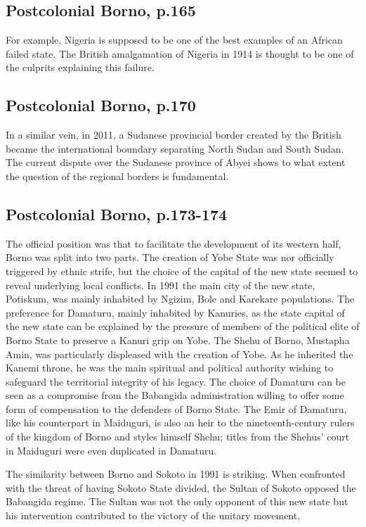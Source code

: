 \documentclass[12pt]{article}
\begin{document}
\subsection{Postcolonial Borno, p.165}

For example, Nigeria is supposed to be one of the best examples of an African
failed state. The British amalgamation of Nigeria in 1914 is thought to be one
of the culprits explaining this failure.

\subsection{Postcolonial Borno, p.170}

In a similar vein, in 2011, a Sudanese provincial border created by the British
became the international boundary separating North Sudan and South Sudan. The
current dispute over the Sudanese province of Abyei shows to what extent the
question of the regional borders is fundamental.

\subsection{Postcolonial Borno, p.173-174}

The official position was that to facilitate the development of its western
half, Borno was split into two parts. The creation of Yobe State was nor
officially triggered by ethnic strife, but the choice of the capital of the new
state seemed to reveal underlying local conflicts. In 1991 the main city of the
new state, Potiskum, was mainly inhabited by Ngizim, Bole and Karekare
populations. The preference for Damaturu, mainly inhabited by Kanuries, as the
state capital of the new state can be explained by the pressure of members of
the political elite of Borno State to preserve a Kanuri grip on Yobe. The Shehu
of Borno, Mustapha Amin, was particularly displeased with the creation of Yobe.
As he inherited the Kanemi throne, he was the main spiritual and political
authority wishing to safeguard the territorial integrity of his legacy. The
choice of Damaturu can be seen as a compromise from the Babangida administration
willing to offer some form of compensation to the defenders of Borno State. The
Emir of Damaturu, like his counterpart in Maiduguri, is also an heir to the
nineteenth-century rulers of the kingdom of Borno and styles himself Shehu;
titles from the Shehus' court in Maiduguri were even duplicated in Damaturu. 

The similarity between Borno and Sokoto in 1991 is striking. When confronted with
the threat of having Sokoto State divided, the Sultan of Sokoto opposed the
Babangida regime. The Sultan was not the only opponent of this new state but his
intervention contributed to the victory of the unitary movement.
\end{document}
